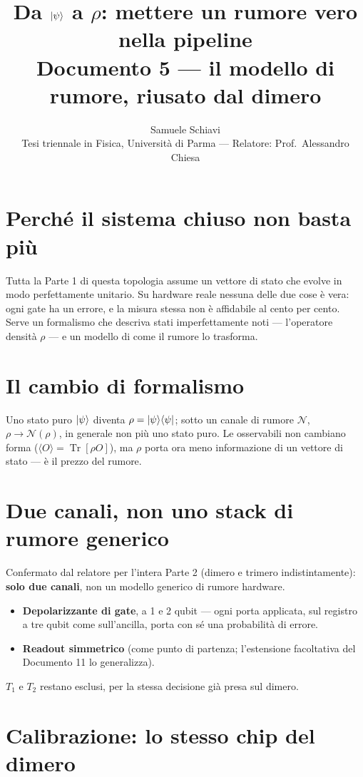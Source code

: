 \documentclass[11pt,a4paper]{article}
\title{\bfseries Da $\lvert \psi\rangle$ a $\rho$: mettere un rumore vero nella pipeline\\[2pt]
\large Documento 5 --- il modello di rumore, riusato dal dimero}
\author{Samuele Schiavi \\ \small Tesi triennale in Fisica, Università di Parma
--- Relatore: Prof.\ Alessandro Chiesa}
\date{}
\providecommand{\Tr}{\operatorname{Tr}}
\begin{document}
\maketitle
\thispagestyle{fancy}

\section{Perché il sistema chiuso non basta più}

Tutta la Parte 1 di questa topologia assume un vettore di stato che evolve
in modo perfettamente unitario. Su hardware reale nessuna delle due cose è
vera: ogni gate ha un errore, e la misura stessa non è affidabile al
cento per cento. Serve un formalismo che descriva stati imperfettamente
noti --- l'operatore densità $\rho$ --- e un modello di come il rumore lo
trasforma.

\section{Il cambio di formalismo}

Uno stato puro $\lvert \psi\rangle$ diventa $\rho=\lvert \psi\rangle\langle \psi \rvert$; sotto un canale
di rumore $\mathcal N$, $\rho\to\mathcal N(\rho)$, in generale non più uno
stato puro. Le osservabili non cambiano forma
($\langle O\rangle=\Tr[\rho O]$), ma $\rho$ porta ora meno informazione di
un vettore di stato --- è il prezzo del rumore.

\section{Due canali, non uno stack di rumore generico}

Confermato dal relatore per l'intera Parte 2 (dimero e trimero
indistintamente): \textbf{solo due canali}, non un modello generico di
rumore hardware.

\begin{itemize}[leftmargin=1.8em,itemsep=3pt]
\item \textbf{Depolarizzante di gate}, a 1 e 2 qubit --- ogni porta
applicata, sul registro a tre qubit come sull'ancilla, porta con sé una
probabilità di errore.
\item \textbf{Readout simmetrico} (come punto di partenza; l'estensione
facoltativa del Documento 11 lo generalizza).
\end{itemize}
$T_1$ e $T_2$ restano esclusi, per la stessa decisione già presa sul
dimero.

\section{Calibrazione: lo stesso chip del dimero}
\end{document}
